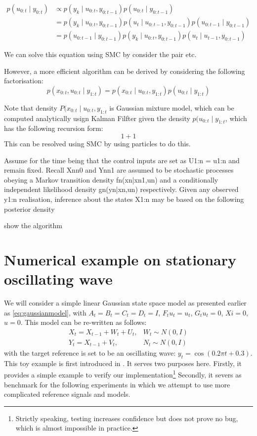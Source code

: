 \begin{align}
p(u_{0:t} \mid y_{0:t}) &\propto p(y_k \mid u_{0:t}, y_{0:t-1}) p(u_{0:t} \mid y_{0:t-1}) \nonumber \\
&=  p(y_k \mid u_{0:t}, y_{0:t-1}) p(u_t \mid u_{0:t-1}, y_{0:t-1}) p(u_{0:t-1} \mid y_{0:t-1}) \nonumber \\
&=  p(u_{0:t-1} \mid y_{0:t-1}) p(y_k \mid u_{0:t}, y_{0:t-1}) p(u_t \mid u_{t-1}, y_{0:t-1})
\end{align}

We can solve this equation using SMC by consider the pair etc.

However, a more efficient algorithm can be derived by considering the following factorisation:
\begin{equation}
  p(x_{0:t}, u_{0:t} \mid y_{1:t}) = p(x_{0:t} \mid u_{0:t}, y_{1:t}) p(u_{0:t} \mid y_{1:t})
\end{equation}

Note that density $P(x_{0:t} \mid u_{0:t}, y_{1:t}$ is Gaussian mixture model, which can be computed analytically usign Kalman Filfter given the density $p(u_{0:t} \mid y_{1:t}$, which has the following recursion form:
\begin{equation}
 1+1
\end{equation}
This can be resolved using SMC by using particles to do this.

Assume for the time being that the control inputs are set as U1:n = u1:n and remain fixed. Recall {Xn}n0 and {Yn}n1 are assumed to be stochastic processes obeying a Markov transition density fn(xn|xn1,un) and a conditionally independent likelihood density gn(yn|xn,un) respectively. Given any observed y1:n realisation, inference about the states X1:n may be based on the following posterior density

show the algorithm 
\section{Numerical example on stationary oscillating wave}
We will consider a simple linear Gaussian state space model as presented earlier as \eqref{eq:gaussianmodel}, with $A_t=B_t=C_t=D_t=I$, $F_t{u_t}=u_t$, $G_t{u_t}=0$, $Xi = 0$, $u=0$. This model can be re-written as follows:
\begin{align}
  X_t = X_{t-1} + W_t + U_t, & W_t \sim N(0,I) \\
Y_t = X_{t-1} + V_t, & N_t \sim N(0,I)
\label{eq:refnmodel}
\end{align}
with the target reference is set to be an oscillating wave: $y_t = \cos(0.2 \pi t + 0.3)$. This toy example is first introduced in \cite{NK11}. It serves two purposes here. Firstly, it provides a simple example to verify our implementation\footnote{Strictly speaking, testing increases confidence but  does not prove no bug, which is almost impossible in practice.} Secondly, it severs as benchmark for the following experiments in which we attempt to use more complicated reference signals and models.

